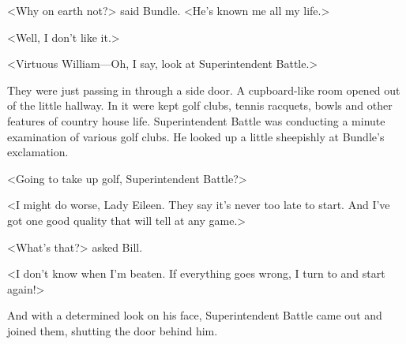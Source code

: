 <Why on earth not?> said Bundle. <He's known me all my life.>

<Well, I don't like it.>

<Virtuous William—Oh, I say, look at Superintendent Battle.>

They were just passing in through a side door. A cupboard-like room opened out of the little hallway. In it were kept golf clubs, tennis racquets, bowls and other features of country house life. Superintendent Battle was conducting a minute examination of various golf clubs. He looked up a little sheepishly at Bundle's exclamation.

<Going to take up golf, Superintendent Battle?>

<I might do worse, Lady Eileen. They say it's never too late to start. And I've got one good quality that will tell at any game.>

<What's that?> asked Bill.

<I don't know when I'm beaten. If everything goes wrong, I turn to and start again!>

And with a determined look on his face, Superintendent Battle came out and joined them, shutting the door behind him.